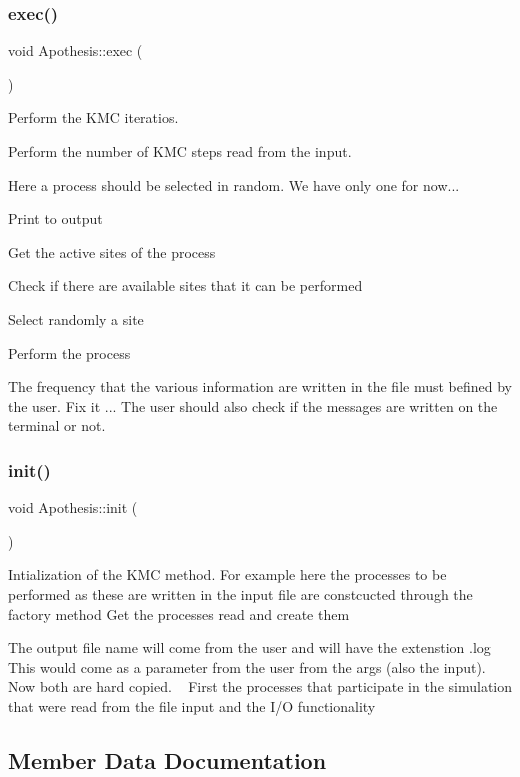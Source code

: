 \subsubsection{\texorpdfstring{exec()}{exec()}}
{\footnotesize\ttfamily void Apothesis\+::exec (\begin{DoxyParamCaption}{ }\end{DoxyParamCaption})}



Perform the K\+MC iteratios. 

Perform the number of K\+MC steps read from the input.

Here a process should be selected in random. We have only one for now...

Print to output

Get the active sites of the process

Check if there are available sites that it can be performed

Select randomly a site

Perform the process

The frequency that the various information are written in the file must befined by the user. Fix it ... The user should also check if the messages are written on the terminal or not. \mbox{\label{classApothesis_acef1e97b07815dbc4879c28521b856ab}} 
\subsubsection{\texorpdfstring{init()}{init()}}
{\footnotesize\ttfamily void Apothesis\+::init (\begin{DoxyParamCaption}{ }\end{DoxyParamCaption})}

Intialization of the K\+MC method. For example here the processes to be performed as these are written in the input file are constcucted through the factory method Get the processes read and create them

The output file name will come from the user and will have the extenstion .log This would come as a parameter from the user from the args (also the input). Now both are hard copied. ~\newline
 First the processes that participate in the simulation that were read from the file input and the I/O functionality 

\subsection{Member Data Documentation}
\mbox{\label{classApothesis_a9b445e59759acb31785cec5412ae1fe4}} 
